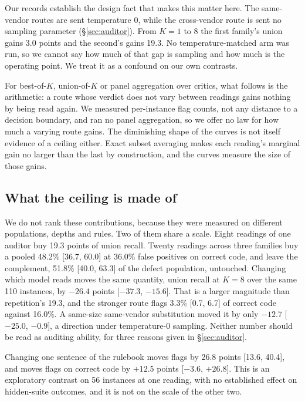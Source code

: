 Our records establish the design fact that makes this matter here. The same-vendor routes are sent
temperature $0$, while the cross-vendor route is sent no sampling parameter
(\S\ref{sec:auditor}). From $K = 1$ to $8$ the first family's union gains 3.0 points and the
second's gains 19.3. No temperature-matched arm was run, so we cannot say how much of that gap is
sampling and how much is the operating point. We treat it as a confound on our own contrasts.

For best-of-$K$, union-of-$K$ or panel aggregation over critics, what follows is the arithmetic: a
route whose verdict does not vary between readings gains nothing by being read again. We measured
per-instance flag counts, not any distance to a decision boundary, and ran no panel aggregation,
so we offer no law for how much a varying route gains. The diminishing shape of the curves is not
itself evidence of a ceiling either. Exact subset averaging makes each reading's marginal gain no
larger than the last by construction, and the curves measure the size of those gains.

\subsection{What the ceiling is made of}

We do not rank these contributions, because they were measured on different populations, depths
and rules. Two of them share a scale. Eight readings of one auditor buy 19.3 points of union
recall. Twenty readings across three families buy a pooled 48.2\% [36.7, 60.0] at 36.0\% false
positives on correct code, and leave the complement, 51.8\% [40.0, 63.3] of the defect
population, untouched. Changing which model reads moves the same quantity, union recall at $K=8$
over the same 110 instances, by $-26.4$ points [$-37.3$, $-15.6$]. That is a larger magnitude than
repetition's 19.3, and the stronger route flags 3.3\% [0.7, 6.7] of correct code against 16.0\%.
A same-size same-vendor substitution moved it by only $-12.7$ [$-25.0$, $-0.9$], a direction under
temperature-0 sampling. Neither number should be read as auditing ability, for three reasons given
in \S\ref{sec:auditor}.

Changing one sentence of the rulebook moves flags by 26.8 points [13.6, 40.4], and moves flags on
correct code by $+12.5$ points [$-3.6$, $+26.8$]. This is an exploratory contrast on 56 instances at
one reading, with no established effect on hidden-suite outcomes, and it is not on the scale of the
other two.


